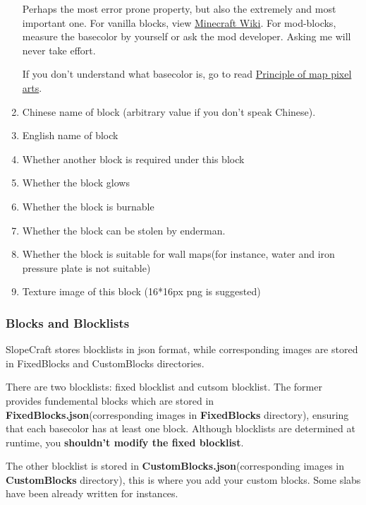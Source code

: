\documentclass{article}
\begin{document}
\begin{enumerate}
   Perhaps the most error prone property, but also the extremely and most important one. For vanilla blocks, view \href{https://minecraft.fandom.com/wiki/Map_item_format}{Minecraft Wiki}. For mod-blocks, measure the basecolor by yourself or ask the mod developer. Asking me will never take effort.
   
   If you don't understand what basecolor is, go to read \href{https://github.com/ToKiNoBug/SlopeCraftTutorial/blob/main/BasicPrinciple/Principle%20of%20map%20pixel%20arts.md}{Principle of map pixel arts}.

   \item Chinese name of block (arbitrary value if you don't speak Chinese).
   \item English name of block
   \item Whether another block is required under this block
   \item Whether the block glows
   \item Whether the block is burnable
   \item Whether the block can be stolen by enderman.
   \item Whether the block is suitable for wall maps(for instance, water and iron pressure plate is not suitable)
   \item Texture image of this block (16*16px png is suggested)  
   \end{enumerate}

   \subsubsection{Blocks and Blocklists}
   SlopeCraft stores blocklists in json format, while corresponding images are stored in FixedBlocks and CustomBlocks directories.
   
   There are two blocklists: fixed blocklist and cutsom blocklist. The former provides fundemental blocks which are stored in \textbf{FixedBlocks.json}(corresponding images in \textbf{FixedBlocks} directory), ensuring that each basecolor has at least one block. Although blocklists are determined at runtime, you \textbf{shouldn't modify the fixed blocklist}.
   
   The other blocklist is stored in \textbf{CustomBlocks.json}(corresponding images in \textbf{CustomBlocks} directory), this is where you add your custom blocks. Some slabs have been already written for instances.
   
\end{document}
